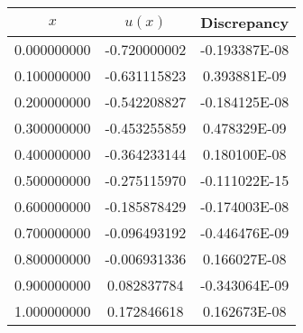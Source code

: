 \documentclass[12pt,a4paper]{article}
\begin{document}
\begin{center} 
\begin{tabular}{|c|c|c|}
\hline
         $x$    &     $u(x)$    &   Discrepancy \\
\hline               
    0.000000000 & -0.720000002  & -0.193387E-08 \\
\hline    
    0.100000000 & -0.631115823  &  0.393881E-09 \\
\hline    
    0.200000000 & -0.542208827  & -0.184125E-08 \\
\hline    
    0.300000000 & -0.453255859  &  0.478329E-09 \\
\hline    
    0.400000000 & -0.364233144  &  0.180100E-08 \\
\hline    
    0.500000000 & -0.275115970  & -0.111022E-15 \\
\hline    
    0.600000000 & -0.185878429  & -0.174003E-08 \\
\hline    
    0.700000000 & -0.096493192  & -0.446476E-09 \\
\hline    
    0.800000000 & -0.006931336  &  0.166027E-08 \\
\hline    
    0.900000000 &  0.082837784  & -0.343064E-09 \\
\hline    
    1.000000000 &  0.172846618  &  0.162673E-08 \\
\hline
\end{tabular}
\end{center}
\end{document}

